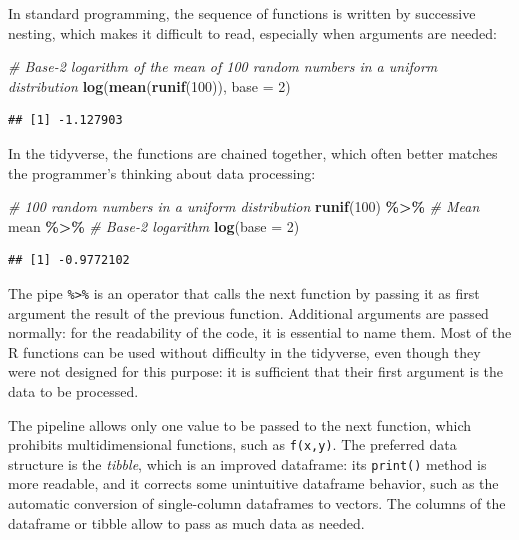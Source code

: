 \documentclass[
  12pt,
  american,
  a4paper,
  extrafontsizes,onecolumn,openright
  ]{memoir}
\newenvironment{Shaded}{\begin{snugshade}}{\end{snugshade}}
\newcommand{\AttributeTok}[1]{\textcolor[rgb]{0.13,0.29,0.53}{#1}}
\newcommand{\CommentTok}[1]{\textcolor[rgb]{0.56,0.35,0.01}{\textit{#1}}}
\newcommand{\DecValTok}[1]{\textcolor[rgb]{0.00,0.00,0.81}{#1}}
\newcommand{\FunctionTok}[1]{\textcolor[rgb]{0.13,0.29,0.53}{\textbf{#1}}}
\newcommand{\NormalTok}[1]{#1}
\newcommand{\SpecialCharTok}[1]{\textcolor[rgb]{0.81,0.36,0.00}{\textbf{#1}}}
\begin{document}
In standard programming, the sequence of functions is written by successive nesting, which makes it difficult to read, especially when arguments are needed:

\scriptsize

\begin{Shaded}
\begin{Highlighting}[]
\CommentTok{\# Base{-}2 logarithm of the mean of 100 random numbers in a uniform distribution}
\FunctionTok{log}\NormalTok{(}\FunctionTok{mean}\NormalTok{(}\FunctionTok{runif}\NormalTok{(}\DecValTok{100}\NormalTok{)), }\AttributeTok{base =} \DecValTok{2}\NormalTok{)}
\end{Highlighting}
\end{Shaded}

\begin{verbatim}
## [1] -1.127903
\end{verbatim}

\normalsize

In the tidyverse, the functions are chained together, which often better matches the programmer's thinking about data processing:

\scriptsize

\begin{Shaded}
\begin{Highlighting}[]
\CommentTok{\# 100 random numbers in a uniform distribution}
\FunctionTok{runif}\NormalTok{(}\DecValTok{100}\NormalTok{) }\SpecialCharTok{\%\textgreater{}\%} 
  \CommentTok{\# Mean}
\NormalTok{  mean }\SpecialCharTok{\%\textgreater{}\%} 
  \CommentTok{\# Base{-}2 logarithm}
  \FunctionTok{log}\NormalTok{(}\AttributeTok{base =} \DecValTok{2}\NormalTok{)}
\end{Highlighting}
\end{Shaded}

\begin{verbatim}
## [1] -0.9772102
\end{verbatim}

\normalsize

The pipe \texttt{\%\textgreater{}\%} is an operator that calls the next function by passing it as first argument the result of the previous function.
Additional arguments are passed normally: for the readability of the code, it is essential to name them.
Most of the R functions can be used without difficulty in the tidyverse, even though they were not designed for this purpose: it is sufficient that their first argument is the data to be processed.

The pipeline allows only one value to be passed to the next function, which prohibits multidimensional functions, such as \texttt{f(x,y)}.
The preferred data structure is the \emph{tibble}, which is an improved dataframe: its \texttt{print()} method is more readable, and it corrects some unintuitive dataframe behavior, such as the automatic conversion of single-column dataframes to vectors.
The columns of the dataframe or tibble allow to pass as much data as needed.
\end{document}
